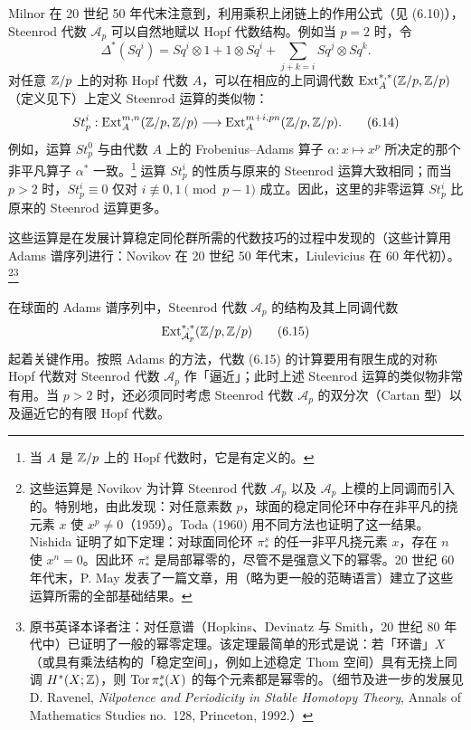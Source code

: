 Milnor 在 20 世纪 50 年代末注意到，利用乘积上闭链上的作用公式（见 (6.10)），Steenrod 代数 $\mathcal{A}_p$ 可以自然地赋以 Hopf 代数结构。例如当 $p=2$ 时，令
\[
\Delta^*(Sq^i)=Sq^i\otimes1+1\otimes Sq^i+\sum_{j+k=i}Sq^j\otimes Sq^k.
\]
对任意 $\mathbb{Z}/p$ 上的对称 Hopf 代数 $A$，可以在相应的上同调代数 $\operatorname{Ext}_A^{*,*}(\mathbb{Z}/p,\mathbb{Z}/p)$（定义见下）上定义 Steenrod 运算的类似物：
\begin{equation}
St^i_p:\operatorname{Ext}_A^{m,n}(\mathbb{Z}/p,\mathbb{Z}/p)\longrightarrow\operatorname{Ext}_A^{m+i,pn}(\mathbb{Z}/p,\mathbb{Z}/p). \tag{6.14}
\end{equation}
例如，运算 $St^0_p$ 与由代数 $A$ 上的 Frobenius--Adams 算子 $\alpha:x\mapsto x^p$ 所决定的那个非平凡算子 $\alpha^*$ 一致。\footnote{当 $A$ 是 $\mathbb{Z}/p$ 上的 Hopf 代数时，它是有定义的。} 运算 $St^i_p$ 的性质与原来的 Steenrod 运算大致相同；而当 $p>2$ 时，$St^i_p\equiv0$ 仅对 $i\not\equiv0,1\pmod{p-1}$ 成立。因此，这里的非零运算 $St^i_p$ 比原来的 Steenrod 运算更多。

这些运算是在发展计算稳定同伦群所需的代数技巧的过程中发现的（这些计算用 Adams 谱序列进行：Novikov 在 20 世纪 50 年代末，Liulevicius 在 60 年代初）。\footnote{这些运算是 Novikov 为计算 Steenrod 代数 $\mathcal{A}_p$ 以及 $\mathcal{A}_p$ 上模的上同调而引入的。特别地，由此发现：对任意素数 $p$，球面的稳定同伦环中存在非平凡的挠元素 $x$ 使 $x^p\ne0$（1959）。Toda (1960) 用不同方法也证明了这一结果。Nishida 证明了如下定理：对球面同伦环 $\pi_*^s$ 的任一非平凡挠元素 $x$，存在 $n$ 使 $x^n=0$。因此环 $\pi_*^s$ 是局部幂零的，尽管不是强意义下的幂零。20 世纪 60 年代末，P. May 发表了一篇文章，用（略为更一般的范畴语言）建立了这些运算所需的全部基础结果。}\footnote{原书英译本译者注：对任意谱（Hopkins、Devinatz 与 Smith，20 世纪 80 年代中）已证明了一般的幂零定理。该定理最简单的形式是说：若「环谱」$X$（或具有乘法结构的「稳定空间」，例如上述稳定 Thom 空间）具有无挠上同调 $H^*(X;\mathbb{Z})$，则 $\operatorname{Tor}\pi_*^s(X)$ 的每个元素都是幂零的。（细节及进一步的发展见 D. Ravenel, \emph{Nilpotence and Periodicity in Stable Homotopy Theory}, Annals of Mathematics Studies no.~128, Princeton, 1992.）}

在球面的 Adams 谱序列中，Steenrod 代数 $\mathcal{A}_p$ 的结构及其上同调代数
\begin{equation}
\operatorname{Ext}_{\mathcal{A}_p}^{*,*}(\mathbb{Z}/p,\mathbb{Z}/p) \tag{6.15}
\end{equation}
起着关键作用。按照 Adams 的方法，代数 (6.15) 的计算要用有限生成的对称 Hopf 代数对 Steenrod 代数 $\mathcal{A}_p$ 作「逼近」；此时上述 Steenrod 运算的类似物非常有用。当 $p>2$ 时，还必须同时考虑 Steenrod 代数 $\mathcal{A}_p$ 的双分次（Cartan 型）以及逼近它的有限 Hopf 代数。


